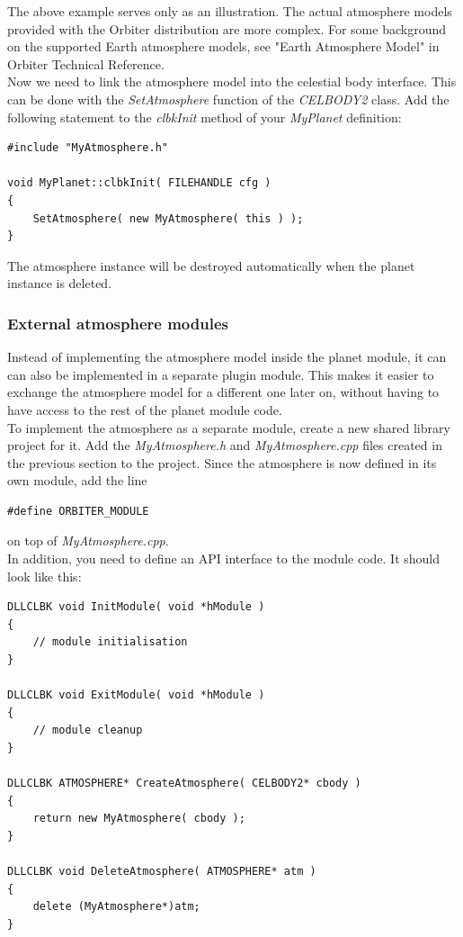 \documentclass[Orbiter Developer Manual.tex]{subfiles}
\begin{document}
\noindent
The above example serves only as an illustration. The actual atmosphere models provided with the Orbiter distribution are more complex. For some background on the supported Earth atmosphere models, see "Earth Atmosphere Model" in Orbiter Technical Reference.\\
Now we need to link the atmosphere model into the celestial body interface. This can be done with the \textit{SetAtmosphere} function of the \textit{CELBODY2} class. Add the following statement to the \textit{clbkInit} method of your \textit{MyPlanet} definition:

\begin{lstlisting}
#include "MyAtmosphere.h"

void MyPlanet::clbkInit( FILEHANDLE cfg )
{
	SetAtmosphere( new MyAtmosphere( this ) );
}
\end{lstlisting}

\noindent
The atmosphere instance will be destroyed automatically when the planet instance is deleted.


\subsubsection{External atmosphere modules}
Instead of implementing the atmosphere model inside the planet module, it can can also be implemented in a separate plugin module. This makes it easier to exchange the atmosphere model for a different one later on, without having to have access to the rest of the planet module code.\\
To implement the atmosphere as a separate module, create a new shared library project for it. Add the \textit{MyAtmosphere.h} and \textit{MyAtmosphere.cpp} files created in the previous section to the project. Since the atmosphere is now defined in its own module, add the line

\begin{lstlisting}
#define ORBITER_MODULE

\end{lstlisting}

\noindent
on top of \textit{MyAtmosphere.cpp}.\\
In addition, you need to define an API interface to the module code. It should look like this:

\begin{lstlisting}
DLLCLBK void InitModule( void *hModule )
{
	// module initialisation
}

DLLCLBK void ExitModule( void *hModule )
{
	// module cleanup
}

DLLCLBK ATMOSPHERE* CreateAtmosphere( CELBODY2* cbody )
{
	return new MyAtmosphere( cbody );
}

DLLCLBK void DeleteAtmosphere( ATMOSPHERE* atm )
{
	delete (MyAtmosphere*)atm;
}
\end{lstlisting}
\end{document}
